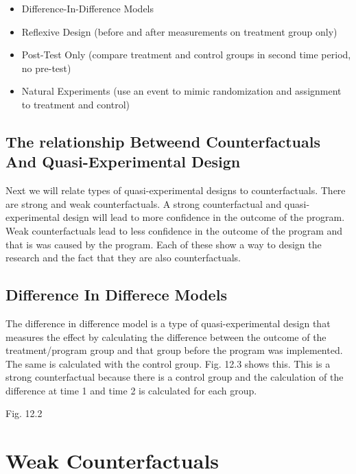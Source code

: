 \documentclass[]{book}
\theoremstyle{definition}
\theoremstyle{definition}
\theoremstyle{definition}
\theoremstyle{remark}
\begin{document}
\begin{itemize}
\item
  Difference-In-Difference Models
\item
  Reflexive Design (before and after measurements on treatment group
  only)
\item
  Post-Test Only (compare treatment and control groups in second time
  period, no pre-test)
\item
  Natural Experiments (use an event to mimic randomization and
  assignment to treatment and control)
\end{itemize}

\hypertarget{the-relationship-betweend-counterfactuals-and-quasi-experimental-design}{%
\subsection{The relationship Betweend Counterfactuals And
Quasi-Experimental
Design}\label{the-relationship-betweend-counterfactuals-and-quasi-experimental-design}}

Next we will relate types of quasi-experimental designs to
counterfactuals. There are strong and weak counterfactuals. A strong
counterfactual and quasi-experimental design will lead to more
confidence in the outcome of the program. Weak counterfactuals lead to
less confidence in the outcome of the program and that is was caused by
the program. Each of these show a way to design the research and the
fact that they are also counterfactuals.

\hypertarget{difference-in-differece-models}{%
\subsection{Difference In Differece
Models}\label{difference-in-differece-models}}

The difference in difference model is a type of quasi-experimental
design that measures the effect by calculating the difference between
the outcome of the treatment/program group and that group before the
program was implemented. The same is calculated with the control group.
Fig. 12.3 shows this. This is a strong counterfactual because there is a
control group and the calculation of the difference at time 1 and time 2
is calculated for each group.

Fig. 12.2

\hypertarget{weak-counterfactuals}{%
\section{Weak Counterfactuals}\label{weak-counterfactuals}}
\end{document}
